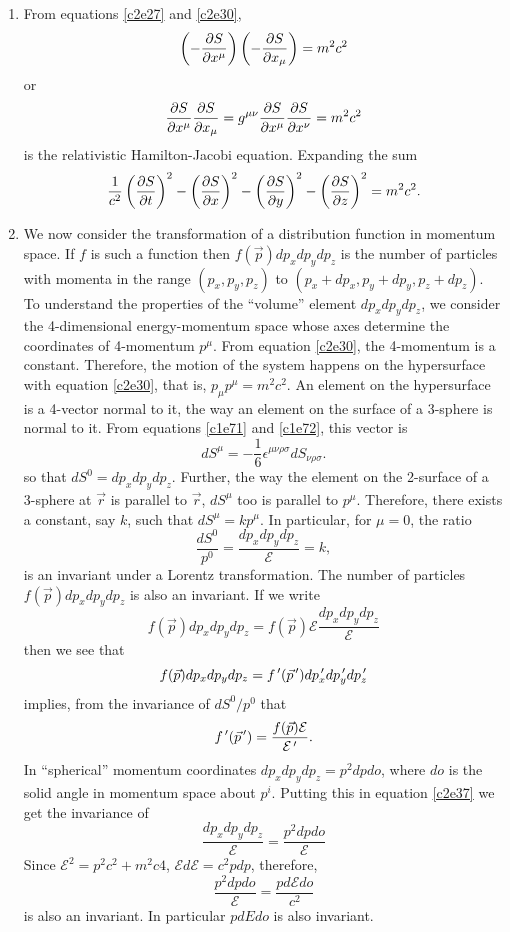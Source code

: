 \begin{enumerate}
\item From equations \eqref{c2e27} and \eqref{c2e30},
\[
\left(-\frac{\partial{S}}{\partial{x^\mu}}\right)\left(-\frac{\partial{S}}{\partial{x_\mu}}\right) = m^2c^2
\]
or
\begin{equation}\label{c2e34}
\frac{\partial{S}}{\partial{x^\mu}}\frac{\partial{S}}{\partial{x_\mu}} = g^{\mu\nu}\frac{\partial{S}}{\partial{x^\mu}}\frac{\partial{S}}{\partial{x^\nu}} = m^2c^2
\end{equation}
is the relativistic Hamilton-Jacobi equation. Expanding the sum
\begin{equation}\label{c2e35}
\frac{1}{c^2}\left(\frac{\partial{S}}{\partial{t}}\right)^2 - \left(\frac{\partial{S}}{\partial{x}}\right)^2 
- \left(\frac{\partial{S}}{\partial{y}}\right)^2 - \left(\frac{\partial{S}}{\partial{z}}\right)^2 = m^2c^2.
\end{equation}

\item We now consider the transformation of a distribution function in momentum
space. If $f$ is such a function then $f(\vec{p})dp_xdp_ydp_z$ is the number of
particles with momenta in the range $(p_x, p_y, p_z)$ to $(p_x + dp_x, p_y + dp_y,
p_z + dp_z)$. To understand the properties of the ``volume'' element $dp_xdp_ydp_z$,
we consider the 4-dimensional energy-momentum space whose axes determine the
coordinates of 4-momentum $p^\mu$. From equation \eqref{c2e30}, the 4-momentum is
a constant. Therefore, the motion of the system happens on the hypersurface with
equation \eqref{c2e30}, that is, $p_\mu p^\mu = m^2c^2$. An element on the 
hypersurface is a 4-vector normal to it, the way an element on the surface of a 
3-sphere is normal to it. From equations \eqref{c1e71} and \eqref{c1e72}, this
vector is
\begin{equation}\label{c2e36}
dS^\mu = -\frac{1}{6}\epsilon^{\mu\nu\rho\sigma}dS_{\nu\rho\sigma}.
\end{equation}
so that $dS^0 = dp_xdp_ydp_z$. Further, the way the element on the 2-surface of
a 3-sphere at $\vec{r}$ is parallel to $\vec{r}$, $dS^\mu$ too is parallel to 
$p^\mu$. Therefore, there exists a constant, say $k$, such that $dS^\mu = kp^\mu$.
In particular, for $\mu = 0$, the ratio
\begin{equation}\label{c2e37}
\frac{dS^0}{p^0} = \frac{dp_xdp_ydp_z}{\mathcal{E}} = k,
\end{equation}
is an invariant under a Lorentz transformation. The number of particles $f(\vec{p})
dp_xdp_ydp_z$ is also an invariant. If we write
\[
f(\vec{p})dp_xdp_ydp_z = f(\vec{p})\mathcal{E}\frac{dp_xdp_ydp_z}{\mathcal{E}}
\]
then we see that
\[
f(\vec{p})dp_xdp_ydp_z = f^{\,\prime}(\vec{p}^{\,\prime})dp_x^{\,\prime} dp_y^{\,\prime} dp_z^{\,\prime}
\]
implies, from the invariance of $dS^0/p^0$ that
\begin{equation}\label{c2e38}
f^{\,\prime}(\vec{p}^{\,\prime}) = \frac{f(\vec{p})\mathcal{E}}{\mathcal{E}^{\,\prime}}.
\end{equation}
In ``spherical'' momentum coordinates $dp_xdp_ydp_z = p^2dpdo$, where $do$ is the
solid angle in momentum space about $p^i$. Putting this in equation \eqref{c2e37}
we get the invariance of
\[
\frac{dp_xdp_ydp_z}{\mathcal{E}} = \frac{p^2dpdo}{\mathcal{E}} 
\]
Since $\mathcal{E}^2 = p^2c^2 + m^2c4$, $\mathcal{E}d\mathcal{E} = c^2 pdp$, therefore,
\[
\frac{p^2dpdo}{\mathcal{E}} = \frac{pd\mathcal{E}do}{c^2}
\]
is also an invariant. In particular $pdEdo$ is also invariant.


\end{enumerate}
